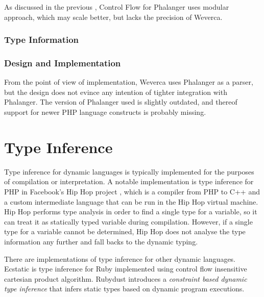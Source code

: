     As discussed in the previous \wchapter{}, Control Flow for 
    Phalanger uses modular approach, which may scale better, 
    but lacks the precision of Weverca.
    
    \subsubsection*{Type Information}
    
    
    \subsubsection*{Design and Implementation}
    
    From the point of view of implementation, Weverca uses 
    Phalanger as a parser, but the design does not evince 
    any intention of tighter integration with Phalanger. 
    The version of Phalanger used is slightly outdated, 
    and thereof support for newer PHP language constructs 
    is probably missing.
    
    
    

    \section{Type Inference}
    
    Type inference for dynamic languages is typically implemented 
    for the purposes of compilation or interpretation. A notable implementation 
    is type inference for PHP in Facebook's Hip Hop project \cite{zhao2012hiphop}, 
    which is a compiler from PHP to C++ and a custom intermediate language 
    that can be run in the Hip Hop virtual machine. Hip Hop performs type 
    analysis in order to find a single type for a variable, so it can treat 
    it as statically typed variable during compilation. However, if a single 
    type for a variable cannot be determined, Hip Hop does not analyse 
    the type information any further and fall backs to the dynamic typing.    
        
    There are implementations of type inference for other dynamic languages. 
    Ecstatic\cite{madsen2007ecstatic} is type inference for Ruby 
    implemented using control flow insensitive cartesian product algorithm. 
    Rubydust\cite{an2011dynamic} introduces a \emph{constraint based dynamic 
    type inference} that infers static types based on dynamic program 
    executions.

